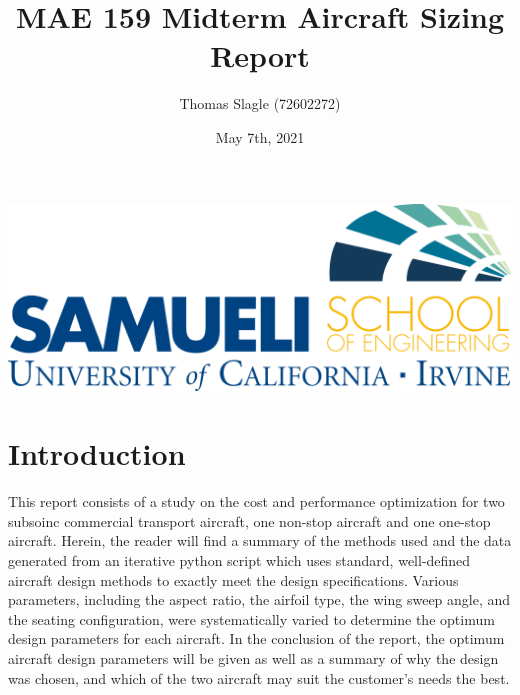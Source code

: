 \documentclass{article}
\title{MAE 159 Midterm Aircraft Sizing Report}
\author{Thomas Slagle (72602272)}
\date{May 7th, 2021}
\begin{document}
    \maketitle
    \begin{center}
        \includegraphics[scale=0.4]{pngjoy.com_uci-logo-uc-irvine-henry-samueli-school-of_6860660.png}
    \end{center}

    \pagebreak
    \tableofcontents
    \pagebreak
    \listoffigures
    \listoftables
    \pagebreak

    \section{Introduction}
    \label{sec:intro}
    \begin{flushleft}
        This report consists of a study on the cost and performance optimization
        for two subsoinc commercial transport aircraft, one non-stop aircraft
        and one one-stop aircraft. Herein, the reader will find a summary of the
        methods used and the data generated from an iterative python script
        which uses standard, well-defined aircraft design methods to exactly
        meet the design specifications. Various parameters, including the aspect
        ratio, the airfoil type, the wing sweep angle, and the seating
        configuration, were systematically varied to determine the optimum
        design parameters for each aircraft. In the conclusion of the report,
        the optimum aircraft design parameters will be given as well as a
        summary of why the design was chosen, and which of the two
        aircraft may suit the customer's needs the best.
    \end{flushleft}
\end{document}
